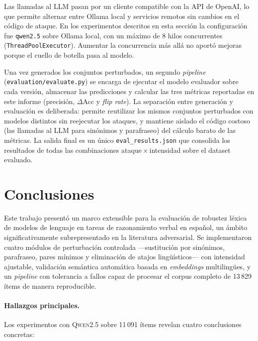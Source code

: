 \documentclass[11pt]{article}
\begin{document}
Las llamadas al LLM pasan por un cliente compatible con la API de
OpenAI, lo que permite alternar entre Ollama local y servicios remotos
sin cambios en el código de ataque. En los experimentos descritos en
esta sección la configuración fue \texttt{qwen2.5} sobre Ollama local,
con un máximo de 8 hilos concurrentes (\texttt{ThreadPoolExecutor}).
Aumentar la concurrencia más allá no aportó mejoras porque el cuello
de botella pasa al modelo.

Una vez generados los conjuntos perturbados, un segundo \textit{pipeline}
\linebreak (\texttt{evaluation/evaluate.py}) se encarga de ejecutar el
modelo evaluador sobre cada versión, almacenar las predicciones y
calcular las tres métricas reportadas en este informe (precisión,
$\Delta$Acc y \textit{flip rate}). La separación entre generación y
evaluación es deliberada: permite reutilizar los mismos conjuntos
perturbados con modelos distintos sin reejecutar los ataques, y
mantiene aislado el código costoso (las llamadas al LLM para
sinónimos y parafraseo) del cálculo barato de las métricas. La salida
final es un único \texttt{eval\_results.json} que consolida los
resultados de todas las combinaciones ataque\,$\times$\,intensidad
sobre el dataset evaluado.

\section{Conclusiones}
\label{sec:conclusions}

Este trabajo presentó un marco extensible para la evaluación de robustez léxica
de modelos de lenguaje en tareas de razonamiento verbal en español, un ámbito
significativamente subrepresentado en la literatura adversarial.
Se implementaron cuatro módulos de perturbación controlada ---sustitución por
sinónimos, parafraseo, pares mínimos y eliminación de atajos lingüísticos---
con intensidad ajustable, validación semántica automática basada en
\textit{embeddings} multilingües, y un \textit{pipeline} con tolerancia a fallos
capaz de procesar el corpus completo de 13\,829 ítems de manera reproducible.

\paragraph{Hallazgos principales.}
Los experimentos con \textsc{Qwen2.5} sobre 11\,091 ítems revelan cuatro
conclusiones concretas:
\end{document}
